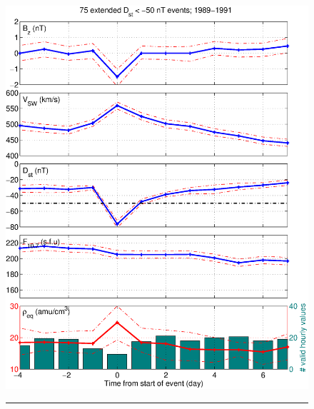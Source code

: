 \documentclass[12pt]{article}
\providecommand{\DIFaddbeginFL}{} %
\providecommand{\DIFaddendFL}{} %
\providecommand{\DIFdelbeginFL}{} %
\providecommand{\DIFdelendFL}{} %
\begin{document}
\begin{figure}[h]
\centering
\DIFdelbeginFL %
\DIFdelendFL \DIFaddbeginFL \includegraphics[scale=0.40]{UsedFigures/2016SW001507R-p03a.eps}
\DIFaddendFL \\
\rule[1ex]{5cm}{1pt}
\\
\DIFdelbeginFL %

\end{figure}
\end{document}
